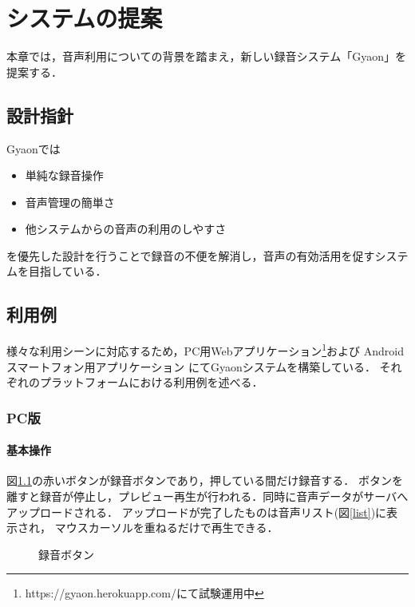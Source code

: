 \chapter{システムの提案}
\label{chap:proposal}

本章では，音声利用についての背景を踏まえ，新しい録音システム「Gyaon」を提案する．

\newpage

\section{設計指針}

Gyaonでは
\begin{itemize}
\item 単純な録音操作
\item 音声管理の簡単さ
\item 他システムからの音声の利用のしやすさ
\end{itemize}
を優先した設計を行うことで録音の不便を解消し，音声の有効活用を促すシステムを目指している．

\section{利用例}
様々な利用シーンに対応するため，PC用Webアプリケーション\footnote{\textsf{https://gyaon.herokuapp.com/にて試験運用中}}および
Androidスマートフォン用アプリケーション
にてGyaonシステムを構築している．
それぞれのプラットフォームにおける利用例を述べる．

\subsection{PC版}

\subsubsection{基本操作}
図\ref{button}の赤いボタンが録音ボタンであり，押している間だけ録音する．
ボタンを離すと録音が停止し，プレビュー再生が行われる．同時に音声データがサーバへアップロードされる．
アップロードが完了したものは音声リスト(図\ref{list})に表示され，
マウスカーソルを重ねるだけで再生できる．

\begin{figure}[H]
\centering
{}
\caption{録音ボタン}
\label{button}
\end{figure}

